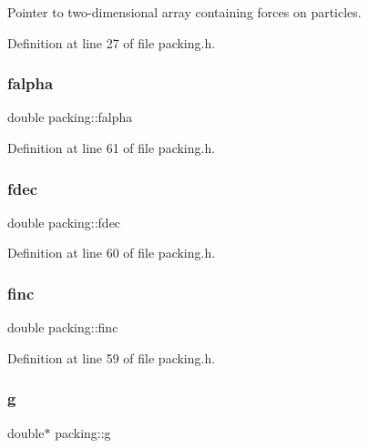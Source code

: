 Pointer to two-\/dimensional array containing forces on particles. 



Definition at line 27 of file packing.\+h.

\mbox{\label{classpacking_a6bd8393eedd89fe3082be57be371dbaf}} 
\subsubsection{\texorpdfstring{falpha}{falpha}}
{\footnotesize\ttfamily double packing\+::falpha\hspace{0.3cm}{\ttfamily [protected]}}



Definition at line 61 of file packing.\+h.

\mbox{\label{classpacking_a2188035c9e34ec7f636822e83e785513}} 
\subsubsection{\texorpdfstring{fdec}{fdec}}
{\footnotesize\ttfamily double packing\+::fdec\hspace{0.3cm}{\ttfamily [protected]}}



Definition at line 60 of file packing.\+h.

\mbox{\label{classpacking_ac67189efe0f5c00878074d9e1a6fd80a}} 
\subsubsection{\texorpdfstring{finc}{finc}}
{\footnotesize\ttfamily double packing\+::finc\hspace{0.3cm}{\ttfamily [protected]}}



Definition at line 59 of file packing.\+h.

\mbox{\label{classpacking_abe2f507633454e3d2d8fd42161bcae09}} 
\subsubsection{\texorpdfstring{g}{g}}
{\footnotesize\ttfamily double$\ast$ packing\+::g\hspace{0.3cm}{\ttfamily [protected]}}



